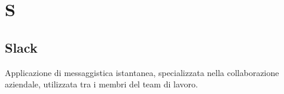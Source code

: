 \section*{S}

\subsection{Slack}
Applicazione di messaggistica istantanea, specializzata nella collaborazione aziendale, utilizzata tra i membri del team di lavoro.

